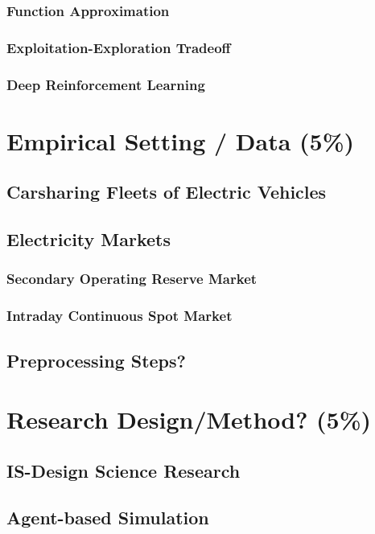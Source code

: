 \documentclass[a4paper]{article}
\begin{document}
\subsubsection{Function Approximation}
\label{sec:org8c3636d}
\subsubsection{Exploitation-Exploration Tradeoff}
\label{sec:org48130eb}
\subsubsection{Deep Reinforcement Learning}
\label{sec:org178c215}
\section{Empirical Setting / Data (5\%)}
\label{sec:orge1db860}
\subsection{Carsharing Fleets of Electric Vehicles}
\label{sec:orgc0d7731}
\subsection{Electricity Markets}
\label{sec:org847ca0f}
\subsubsection{Secondary Operating Reserve Market}
\label{sec:org540173a}
\subsubsection{Intraday Continuous Spot Market}
\label{sec:org6c57f2c}
\subsection{Preprocessing Steps?}
\label{sec:orgfe57032}

\section{Research Design/Method? (5\%)}
\label{sec:org6d6869c}
\subsection{IS-Design Science Research}
\label{sec:orgcfd0a5f}
\subsection{Agent-based Simulation}
\label{sec:org2359826}
\end{document}

